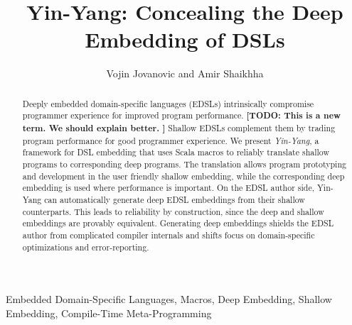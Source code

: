 \documentclass{llncs}
\newcommand{\todo}[1]{{\color{red} \textbf{[TODO: #1 ]}}}
\newcommand{\todo}[1]{}
\newcommand{\tool}{Yin-Yang\xspace}
\begin{document}
\title{Yin-Yang: Concealing the Deep Embedding of DSLs}

\author{Vojin Jovanovic and Amir Shaikhha}


\maketitle

\begin{abstract}
%
  Deeply embedded domain-specific languages (EDSLs) intrinsically
  compromise programmer experience for improved program
  performance. \todo{This is a new term. We should explain
    better.} Shallow EDSLs complement them by trading program
  performance for good programmer experience.
%
  We present \emph{\tool}, a framework for DSL embedding that uses
  Scala macros to reliably translate shallow \edsl programs to
  corresponding deep \edsl programs. The translation allows program
  prototyping and development in the user friendly shallow
  embedding, while the corresponding deep embedding is used where
  performance is important.
%
  On the EDSL author side, Yin-Yang can automatically generate deep
  EDSL embeddings from their shallow counterparts. This leads to
  reliability by construction, since the deep and shallow embeddings
  are provably equivalent. Generating deep embeddings shields the EDSL
  author from complicated compiler internals and shifts focus on
  domain-specific optimizations and error-reporting.
\end{abstract}

\keywords
Embedded Domain-Specific Languages, Macros, Deep Embedding, Shallow Embedding, Compile-Time Meta-Programming

\end{document}
